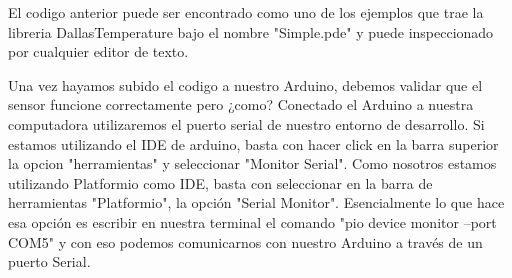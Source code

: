 \par \noindent
El codigo anterior puede ser encontrado como uno de los ejemplos que trae la libreria DallasTemperature\cite{dallas-github} bajo el nombre "Simple.pde" y puede inspeccionado por cualquier editor de texto.

\clearpage

\par \noindent
Una vez hayamos subido el codigo a nuestro Arduino, debemos validar que el sensor funcione correctamente pero ¿como? Conectado el Arduino a nuestra computadora utilizaremos el puerto serial de nuestro entorno de desarrollo. Si estamos utilizando el IDE de arduino, basta con hacer click en la barra superior la opcion "herramientas" y seleccionar "Monitor Serial". Como nosotros estamos utilizando Platformio como IDE, basta con seleccionar en la barra de herramientas "Platformio", la opción "Serial Monitor". Esencialmente lo que hace esa opción es escribir en nuestra terminal el comando 
"pio device monitor --port COM5" y con eso podemos comunicarnos con nuestro Arduino a través de un puerto Serial.